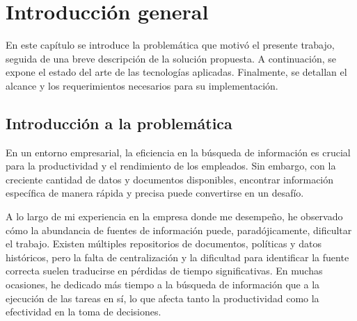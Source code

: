 
\chapter{Introducción general} %

\label{Chapter1} %
\label{IntroGeneral}


\newcommand{\keyword}[1]{\textbf{#1}}
\newcommand{\tabhead}[1]{\textbf{#1}}
\newcommand{\code}[1]{\texttt{#1}}
\newcommand{\file}[1]{\texttt{\bfseries#1}}
\newcommand{\option}[1]{\texttt{\itshape#1}}
\newcommand{\grados}{$^{\circ}$}


En este capítulo se introduce la problemática que motivó el presente trabajo, seguida de una breve descripción de la solución propuesta. 
A continuación, se expone el estado del arte de las tecnologías aplicadas. 
Finalmente, se detallan el alcance y los requerimientos necesarios para su implementación.

\section{Introducción a la problemática}

En un entorno empresarial, la eficiencia en la búsqueda de información es crucial para la
productividad y el rendimiento de los empleados. Sin embargo, con la creciente cantidad de
datos y documentos disponibles, encontrar información específica de manera rápida y precisa
puede convertirse en un desafío.

A lo largo de mi experiencia en la empresa donde me desempeño, he observado cómo la abundancia 
de fuentes de información puede, paradójicamente, dificultar el trabajo. Existen múltiples 
repositorios de documentos, políticas y datos históricos, pero la falta de centralización y la 
dificultad para identificar la fuente correcta suelen traducirse en pérdidas de tiempo significativas. 
En muchas ocasiones, he dedicado más tiempo a la búsqueda de información que a la ejecución de las tareas 
en sí, lo que afecta tanto la productividad como la efectividad en la toma de decisiones.


